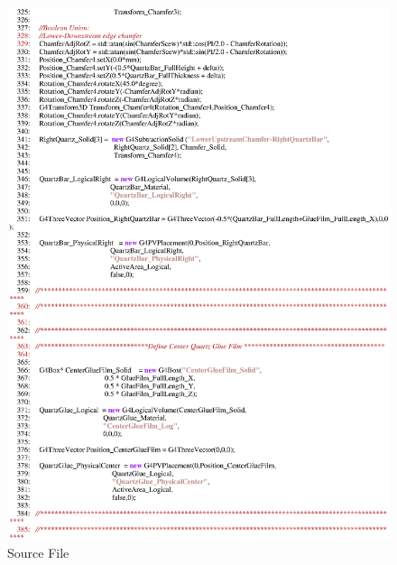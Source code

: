 \begin{figure}[ht]
  \hspace{0cm}
  \includegraphics[scale=0.8]{./figures5/QweakSimCerenkovDetector.cc-p6.eps}
  \caption{Source File}
           \label{fig:V-SC-10}
\end{figure}
\clearpage

